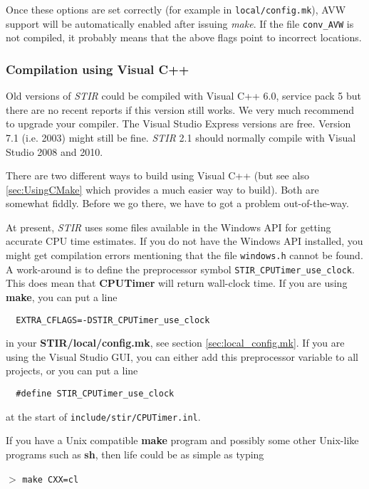 \documentclass{article}
\newcommand{\cmdline}[1]{\par \noindent $>$ \texttt{#1}\par}
\begin{document}
Once these options are set correctly (for example in \texttt{local/config.mk}), 
AVW support will be automatically enabled after issuing \textit{make}. 
If the file \texttt{conv\_AVW} is not compiled, it probably 
means that the above flags point to incorrect locations.


\subsubsection{
Compilation using Visual C++}
\label{sec:VC}

Old versions of \textit{STIR} could be compiled with Visual C++ 6.0, service pack 5 but there are no recent 
reports if this version still works. We very much recommend to upgrade your compiler. The Visual
Studio Express versions are free. Version 7.1 (i.e. 2003) might still be fine. \textit{STIR} 2.1
should normally compile with Visual Studio 2008 and 2010.

There are two different ways to build using Visual C++ (but see also \ref{sec:UsingCMake}
which provides a much easier way to build). Both 
are somewhat fiddly. Before we go there, we have to got a problem out-of-the-way.

{ 
}
At present, \textit{STIR} uses some files available in the Windows API for 
getting accurate CPU time estimates. If you do not have the Windows API
installed, you might get compilation errors mentioning that 
the file \texttt{windows.h} cannot be found. A work-around is to
define the preprocessor symbol \texttt{STIR\_CPUTimer\_use\_clock}. 
This does mean that \textbf{CPUTimer} will return wall-clock time.
If you are using \textbf{make}, you can put a line
\begin{verbatim}
  EXTRA_CFLAGS=-DSTIR_CPUTimer_use_clock
\end{verbatim}
in your \textbf{STIR/local/config.mk}, see section \ref{sec:local_config.mk}.
If you are using the Visual Studio GUI, you can either add this preprocessor
variable to all projects, or you can put a line
\begin{verbatim}
  #define STIR_CPUTimer_use_clock
\end{verbatim}
at the start of \texttt{include/stir/CPUTimer.inl}.


{ 
}


If you have a Unix compatible \textbf{make} program and possibly some 
other Unix-like programs such as \textbf{sh}, then life could be as 
simple as typing
\cmdline{make CXX=cl}
\end{document}
